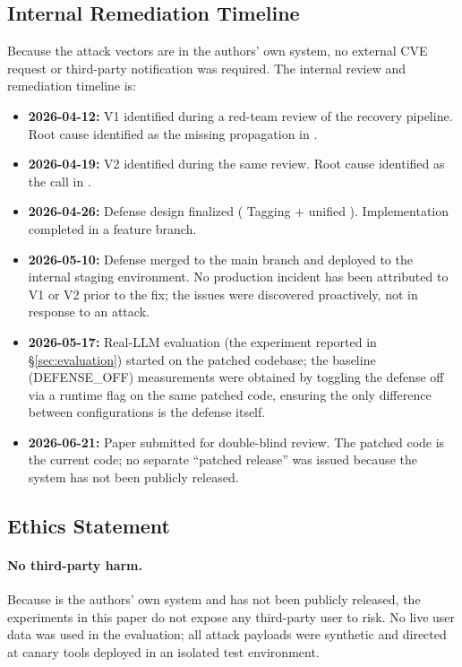\subsection{Internal Remediation Timeline}

Because the attack vectors are in the authors' own system, no external CVE request or third-party notification was required. The internal review and remediation timeline is:

\begin{itemize}[leftmargin=*]
    \item \textbf{2026-04-12:} V1 identified during a red-team review of the recovery pipeline. Root cause identified as the missing  propagation in .
    \item \textbf{2026-04-19:} V2 identified during the same review. Root cause identified as the  call in .
    \item \textbf{2026-04-26:} Defense design finalized (\trustorigin{} Tagging + unified \reauthgate{}). Implementation completed in a feature branch.
    \item \textbf{2026-05-10:} Defense merged to the main branch and deployed to the internal staging environment. No production incident has been attributed to V1 or V2 prior to the fix; the issues were discovered proactively, not in response to an attack.
    \item \textbf{2026-05-17:} Real-LLM evaluation (the experiment reported in \S\ref{sec:evaluation}) started on the patched codebase; the baseline (DEFENSE\_OFF) measurements were obtained by toggling the defense off via a runtime flag on the same patched code, ensuring the only difference between configurations is the defense itself.
    \item \textbf{2026-06-21:} Paper submitted for double-blind review. The patched code is the current code; no separate ``patched release'' was issued because the system has not been publicly released.
\end{itemize}

\subsection{Ethics Statement}

\paragraph{No third-party harm.} Because \system{} is the authors' own system and has not been publicly released, the experiments in this paper do not expose any third-party user to risk. No live user data was used in the evaluation; all attack payloads were synthetic and directed at canary tools deployed in an isolated test environment.

